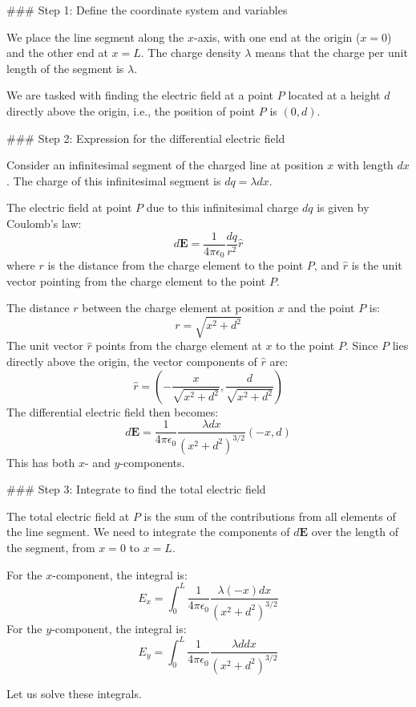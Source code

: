 \documentclass{article}
\begin{document}
### Step 1: Define the coordinate system and variables

We place the line segment along the \( x \)-axis, with one end at the origin (\( x = 0 \)) and the other end at \( x = L \). The charge density \( \lambda \) means that the charge per unit length of the segment is \( \lambda \). 

We are tasked with finding the electric field at a point \( P \) located at a height \( d \) directly above the origin, i.e., the position of point \( P \) is \( (0, d) \).

### Step 2: Expression for the differential electric field

Consider an infinitesimal segment of the charged line at position \( x \) with length \( dx \). The charge of this infinitesimal segment is \( dq = \lambda dx \).

The electric field at point \( P \) due to this infinitesimal charge \( dq \) is given by Coulomb's law:
\[
d\mathbf{E} = \frac{1}{4\pi \epsilon_0} \frac{dq}{r^2} \hat{r}
\]
where \( r \) is the distance from the charge element to the point \( P \), and \( \hat{r} \) is the unit vector pointing from the charge element to the point \( P \).

The distance \( r \) between the charge element at position \( x \) and the point \( P \) is:
\[
r = \sqrt{x^2 + d^2}
\]
The unit vector \( \hat{r} \) points from the charge element at \( x \) to the point \( P \). Since \( P \) lies directly above the origin, the vector components of \( \hat{r} \) are:
\[
\hat{r} = \left( -\frac{x}{\sqrt{x^2 + d^2}}, \frac{d}{\sqrt{x^2 + d^2}} \right)
\]
The differential electric field then becomes:
\[
d\mathbf{E} = \frac{1}{4\pi \epsilon_0} \frac{\lambda dx}{(x^2 + d^2)^{3/2}} \left( -x, d \right)
\]
This has both \( x \)- and \( y \)-components.

### Step 3: Integrate to find the total electric field

The total electric field at \( P \) is the sum of the contributions from all elements of the line segment. We need to integrate the components of \( d\mathbf{E} \) over the length of the segment, from \( x = 0 \) to \( x = L \).

For the \( x \)-component, the integral is:
\[
E_x = \int_0^L \frac{1}{4\pi \epsilon_0} \frac{\lambda (-x) dx}{(x^2 + d^2)^{3/2}}
\]
For the \( y \)-component, the integral is:
\[
E_y = \int_0^L \frac{1}{4\pi \epsilon_0} \frac{\lambda d dx}{(x^2 + d^2)^{3/2}}
\]

Let us solve these integrals.
\end{document}
